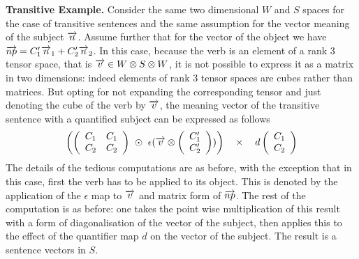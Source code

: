 \smallskip
\noindent
{\bf Transitive Example.}
Consider the same two dimensional $W$ and $S$ spaces for the case of transitive sentences and the same assumption for the vector meaning of the subject $\overrightarrow{n}$. Assume further that for the vector of the object we have $\overrightarrow{np} = C'_1 \overrightarrow{n}_1 + C'_2 \overrightarrow{n}_2$. In this case, because the verb is an element of a rank 3 tensor space, that is $\overrightarrow{v} \in W \otimes S \otimes W$, it is not possible to express it as a matrix in two dimensions: indeed elements of  rank 3 tensor   spaces are cubes rather than matrices. But opting for not expanding the corresponding tensor and just denoting the cube of the verb by $\overrightarrow{v}$, the meaning vector of the transitive sentence with a quantified subject can be expressed as follows
\[
\left(
 \left ( \begin{array}{cc}
 C_1 & C_1\\ C_2 & C_2
  \end{array} \right)
 \ \odot \ 
\epsilon (\ov{v} \otimes\left (\begin{array}{c} C'_1 \\C'_2 \end{array} \right) ) \right)
 \quad \times \quad
 d\left ( \begin{array}{c} C_1 \\ C_2 \end{array} \right )
\]
The details of the tedious computations are as before, with the exception that in this case, first the verb has to be applied to its object. This is denoted by the application of the $\epsilon$ map to $\overrightarrow{v}$ and matrix form of $\overrightarrow{np}$. The rest of the computation is as before: one takes the point wise multiplication of this result with a form of diagonalisation of the vector of the subject, then applies this to the effect of the quantifier map $d$ on the vector of the subject. The result is a sentence vectors in $S$. 

